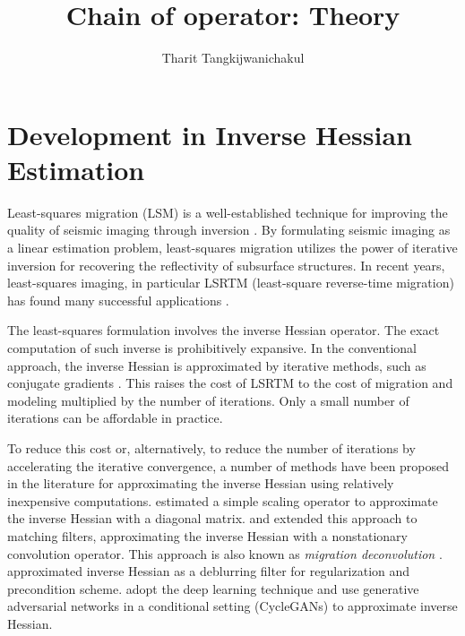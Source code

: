 \title{Chain of operator: Theory}
\author{Tharit Tangkijwanichakul}
\label{ch:chapter-background}
\maketitle
{}

\newcommand\inv[1]{#1\raisebox{1.15ex}{$\scriptscriptstyle-\!1$}} %

\section{Development in Inverse Hessian Estimation}

Least-squares migration (LSM) is a well-established technique for improving the quality of seismic imaging through inversion \cite[]{nemeth,ronen}. By formulating seismic imaging as a linear estimation problem, least-squares migration utilizes the power of iterative inversion for recovering the reflectivity of subsurface structures. In recent years, least-squares imaging, in particular LSRTM (least-square reverse-time migration) has found many successful applications \cite[]{dai,wang,wong}.

The least-squares formulation involves the inverse Hessian operator. The exact computation of such inverse is prohibitively expansive. In the conventional approach, the inverse Hessian is approximated by iterative methods, such as conjugate gradients \cite[]{tarantola,sun,xue}. This raises the cost of LSRTM to the cost of migration and modeling multiplied by the number of iterations. Only a small number of iterations can be affordable in practice. 

To reduce this cost or, alternatively, to reduce the number of iterations by accelerating the iterative convergence, a number of methods have been proposed in the literature for approximating the inverse Hessian using relatively inexpensive computations. \cite{rickett} estimated a simple scaling operator to approximate the inverse Hessian with a diagonal matrix. \cite{guitton} and \cite{greer} extended this approach to matching filters, approximating the inverse Hessian with a nonstationary convolution operator. This approach is also known as \emph{migration deconvolution} \cite[]{hu2001,yu2006}. \cite{aoki} approximated inverse Hessian as a deblurring filter for regularization and precondition scheme. \cite{kaur} adopt the deep learning technique and use generative adversarial networks in a conditional setting (CycleGANs) to approximate inverse Hessian.

